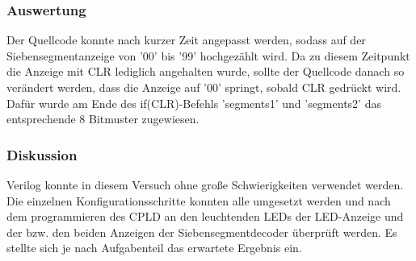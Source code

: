\documentclass[12pt,a4paper]{article}
\begin{document}
\subsubsection*{Auswertung}
Der Quellcode konnte nach kurzer Zeit angepasst werden, sodass auf der Siebensegmentanzeige von '00' bis '99' hochgezählt wird. Da zu diesem Zeitpunkt die Anzeige mit CLR lediglich angehalten wurde, sollte der Quellcode danach so verändert werden, dass die Anzeige auf '00' springt, sobald CLR gedrückt wird. Dafür wurde am Ende des if(CLR)-Befehls 'segments1' und 'segments2' das entsprechende 8 Bitmuster zugewiesen.

\subsubsection*{Diskussion}
Verilog konnte in diesem Versuch ohne große Schwierigkeiten verwendet werden.
Die einzelnen Konfigurationsschritte konnten alle umgesetzt werden und nach dem programmieren des CPLD an den leuchtenden LEDs der LED-Anzeige und der bzw. den beiden Anzeigen der Siebensegmentdecoder überprüft werden. Es stellte sich je nach Aufgabenteil das erwartete Ergebnis ein.
\end{document}
